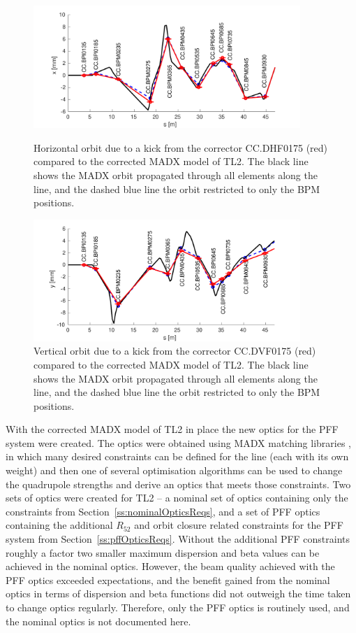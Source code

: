 \begin{figure}
  \centering
  \includegraphics[width=0.9\textwidth]{Figures/optics/modelCorrectedH}
  \caption{Horizontal orbit due to a kick from the corrector CC.DHF0175 (red) compared to the corrected MADX model of TL2. The black line shows the MADX orbit propagated through all elements along the line, and the dashed blue line the orbit restricted to only the BPM positions.}
  \label{f:modelCorrectedH}
  \includegraphics[width=0.9\textwidth]{Figures/optics/modelCorrectedV}
  \caption{Vertical orbit due to a kick from the corrector CC.DVF0175 (red) compared to the corrected MADX model of TL2. The black line shows the MADX orbit propagated through all elements along the line, and the dashed blue line the orbit restricted to only the BPM positions.}
  \label{f:modelCorrectedV}
\end{figure}


With the corrected MADX model of TL2 in place the new optics for the PFF system were created. The optics were obtained using MADX matching libraries \cite{madx}, in which many desired constraints can be defined for the line (each with its own weight) and then one of several optimisation algorithms can be used to change the quadrupole strengths and derive an optics that meets those constraints. Two sets of optics were created for TL2 -- a nominal set of optics containing only the constraints from Section~\ref{ss:nominalOpticsReqs}, and a set of PFF optics containing the additional \(R_{52}\) and orbit closure related constraints for the PFF system from Section~\ref{ss:pffOpticsReqs}. Without the additional PFF constraints roughly a factor two smaller maximum dispersion and beta values can be achieved in the nominal optics. However, the beam quality achieved with the PFF optics exceeded expectations, and the benefit gained from the nominal optics in terms of dispersion and beta functions did not outweigh the time taken to change optics regularly. Therefore, only the PFF optics is routinely used, and the nominal optics is not documented here.

